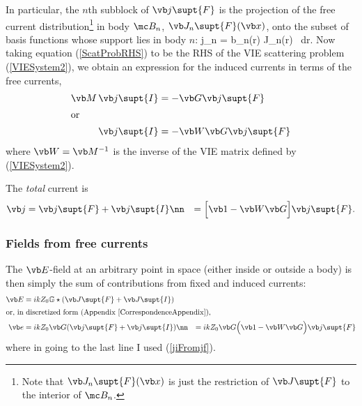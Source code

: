 \documentclass[letterpaper]{article}
\begin{document}
In particular, the $n$th subblock of $\vb j\supt{F}$ is the
projection of the free current distribution\footnote{Note that 
$\vb J_n\supt{F}(\vb x)$ is just the restriction of $\vb J\supt{F}$ 
to the interior of $\mc B_n$.} in body $\mc B_n$, 
$\vb J_n\supt{F}(\vb x)$, onto the subset of basis functions whose 
support lies in body $n$:
{ j_{n\alpha} 
  = 
  \int \vb b_{n\alpha}(\vb r) \cdot \vb J_n(\vb r) \, d\vb r.
}
Now taking equation (\ref{ScatProbRHS}) to be the RHS of the VIE scattering
problem (\ref{VIESystem2}), we obtain an expression for the induced
currents in terms of the free currents, 
\begin{align}
  \vb M \, \vb j\supt{I} &= - \vb G \vb j\supt{F} 
\\
\intertext {or}
  \vb j\supt{I} &= -\vb W \vb G \vb j\supt{F} 
\label{jiFromjf}
\end{align}
where $\vb W=\vb M^{-1}$ is the inverse of the VIE matrix 
defined by (\ref{VIESystem2}).

The \textit{total} current is 
\begin{align}
 \vb j &= \vb j\supt{F} + \vb j\supt{I}
\nn
  &= \Big[ \vb 1 - \vb W \vb G\Big] \vb j\supt{F}.
\label{jTot}
\end{align}

\subsubsection*{Fields from free currents}

The $\vb E$-field at an arbitrary point in space (either
inside or outside a body) is then simply the sum of 
contributions from fixed and induced currents:
\begin{align}
 \vb E &= ikZ_0 \mathbb{G} \star (\vb J\supt{F} + \vb J\supt{I})
\label{EConvolution} \\
\intertext{or, in discretized form (Appendix \ref{CorrespondenceAppendix}),}
 \vb e &= ikZ_0 \vb G (\vb j\supt{F} + \vb j\supt{I}) 
\nn
       &= ikZ_0 \vb G \Big( \vb 1 - \vb W \vb G \Big) \vb j\supt{F}
\label{efromjf}
\end{align}
where in going to the last line I used (\ref{jiFromjf}).
\end{document}
